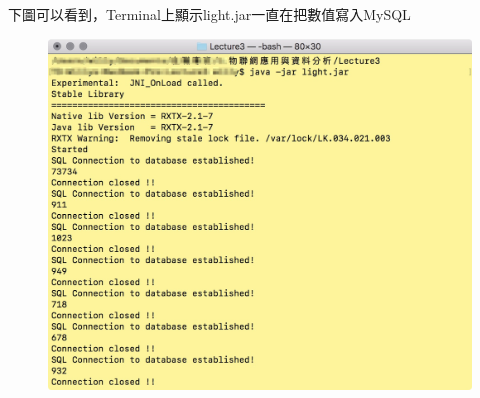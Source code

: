 \documentclass[12pt,a4paper]{article}
\begin{document}
{\newpage
下圖可以看到，Terminal上顯示light.jar一直在把數值寫入MySQL 
\begin{figure}[ht]
\centering
\includegraphics[width=1.0\textwidth]{image/consoletomysql.jpg}
\end{figure}
}

\newpage
\end{document}
